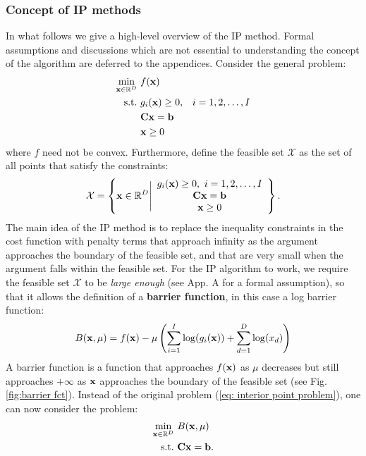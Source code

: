 \subsubsection{Concept of IP methods}
In what follows we give a high-level overview of the IP method. Formal assumptions and discussions which are not essential to understanding the concept of the algorithm are deferred to the appendices. Consider the general problem:
\begin{equation} \label{eq: interior point problem}
   \begin{aligned}
    \min_{\mathbf{x} \in \mathbb{R}^D} &~f(\mathbf{x}) \\ \mathrm{s.t.}&~g_i(\mathbf{x}) \geq 0,  &i=1,2,\ldots, I \\ &~\mathbf{C}\mathbf{x} = \mathbf{b}\\ &~\mathbf{x}\geq0
    \end{aligned} 
\end{equation}
where $f$ need not be convex. Furthermore, define the feasible set $\mathcal{X}$ as the set of all points that satisfy the constraints:
\[
\mathcal{X} = \left\{ \mathbf{x} \in \mathbb{R}^D \Bigg| \begin{array}{c}
     g_i(\mathbf{x}) \geq 0,~i=1,2,\ldots, I \\ \mathbf{C}\mathbf{x} = \mathbf{b}\\ \mathbf{x} \geq 0
\end{array}\right\}.
\]
 The main idea of the IP method is to replace  the inequality constraints in the cost function with penalty terms  that approach infinity as the argument approaches the boundary of the feasible set, and that are very small when the argument falls within the feasible set. For the IP algorithm to work, we require the feasible set $\mathcal{X}$ to be \textit{large enough} (see App. A for a formal assumption), so that it allows the definition of a \textbf{barrier function}, in this case a log barrier function:
\[
B(\mathbf{x}, \mu) = f(\mathbf{x}) - \mu \left( \sum_{i=1}^I \log(g_i(\mathbf{x})) + \sum_{d = 1}^D \log(x_d)\right)
\]
A {barrier function} is a function that approaches $f(\mathbf{x})$ as $\mu$ decreases but still approaches $+\infty$ as $\mathbf{x}$ approaches the boundary of the feasible set (see Fig. \ref{fig:barrier fct}). Instead of the original problem (\ref{eq: interior point problem}), one can now consider the problem:
\begin{equation} \label{eq: barrier problem}
\begin{aligned}
    \min_{\mathbf{x} \in \mathbb{R}^D} &~B(\mathbf{x}, \mu) \\
    \mathrm{s.t.}&~\mathbf{C}\mathbf{x} = \mathbf{b}.
\end{aligned}
\end{equation}

